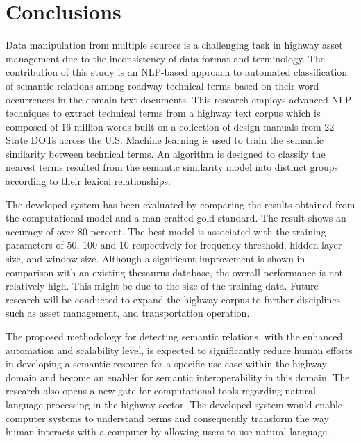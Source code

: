 \documentclass[Journal, BackFigs,NoLists, DoubleSpace]{ascelike}%
\begin{document}
\section{Conclusions} \label{sec:conclns3} 
Data manipulation from multiple sources is a challenging task in highway asset management due to the inconsistency of data format and terminology. The contribution of this study is an NLP-based approach to automated classification of semantic relations among roadway technical terms based on their word occurrences in the domain text documents. This research employs advanced NLP techniques to extract technical terms from a highway text corpus which is composed of 16 million words built on a collection of design manuals from 22 State DOTs across the U.S. Machine learning is used to train the semantic similarity between technical terms. An algorithm is designed to classify the nearest terms resulted from the semantic similarity model into distinct groups according to their lexical relationships. 
\par
The developed system has been evaluated by comparing the results obtained from the computational model and a man-crafted gold standard. The result shows an accuracy of over 80 percent. The best model is associated with the training parameters of 50, 100 and 10 respectively for frequency threshold, hidden layer size, and window size. Although a significant improvement is shown in comparison with an existing thesaurus database, the overall performance is not relatively high. This might be due to the size of the training data. Future research will be conducted to expand the highway corpus to further disciplines such as asset management, and transportation operation. 
\par
The proposed methodology for detecting semantic relations, with the enhanced automation and scalability level, is expected to significantly reduce human efforts in developing a semantic resource for a specific use case within the highway domain and become an enabler for semantic interoperability in this domain. The research also opens a new gate for computational tools regarding natural language processing in the highway sector. The developed system would enable computer systems to understand terms and consequently transform the way human interacts with a computer by allowing users to use natural language.


%
%
\listoffigures
\end{document}
